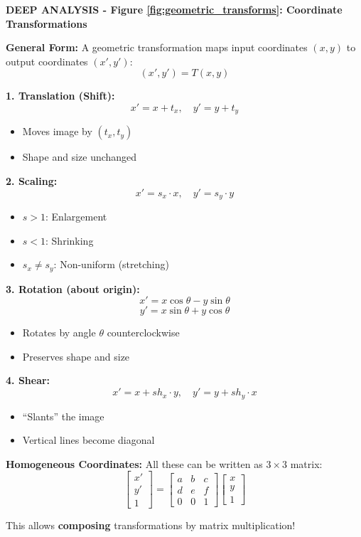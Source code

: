 \documentclass[12pt,a4paper]{article}
\begin{document}
\begin{deepexplanation}
\textbf{DEEP ANALYSIS - Figure \ref{fig:geometric_transforms}: Coordinate Transformations}

\textbf{General Form:}
A geometric transformation maps input coordinates $(x, y)$ to output coordinates $(x', y')$:
\[
(x', y') = T(x, y)
\]

\textbf{1. Translation (Shift):}
\[
x' = x + t_x, \quad y' = y + t_y
\]
\begin{itemize}
    \item Moves image by $(t_x, t_y)$
    \item Shape and size unchanged
\end{itemize}

\textbf{2. Scaling:}
\[
x' = s_x \cdot x, \quad y' = s_y \cdot y
\]
\begin{itemize}
    \item $s > 1$: Enlargement
    \item $s < 1$: Shrinking
    \item $s_x \neq s_y$: Non-uniform (stretching)
\end{itemize}

\textbf{3. Rotation (about origin):}
\[
x' = x\cos\theta - y\sin\theta
\]
\[
y' = x\sin\theta + y\cos\theta
\]
\begin{itemize}
    \item Rotates by angle $\theta$ counterclockwise
    \item Preserves shape and size
\end{itemize}

\textbf{4. Shear:}
\[
x' = x + sh_x \cdot y, \quad y' = y + sh_y \cdot x
\]
\begin{itemize}
    \item ``Slants'' the image
    \item Vertical lines become diagonal
\end{itemize}

\textbf{Homogeneous Coordinates:}
All these can be written as $3 \times 3$ matrix:
\[
\begin{bmatrix} x' \\ y' \\ 1 \end{bmatrix} = 
\begin{bmatrix} a & b & c \\ d & e & f \\ 0 & 0 & 1 \end{bmatrix}
\begin{bmatrix} x \\ y \\ 1 \end{bmatrix}
\]

This allows \textbf{composing} transformations by matrix multiplication!
\end{deepexplanation}
\end{document}
